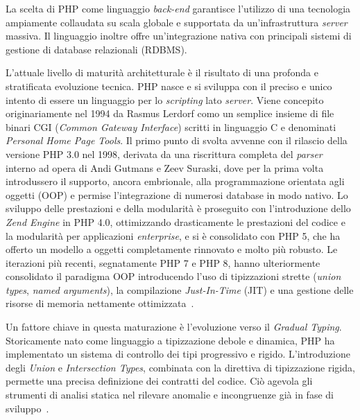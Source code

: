 La scelta di PHP come linguaggio \textit{back-end} garantisce l’utilizzo di una tecnologia ampiamente collaudata su scala globale e supportata da un’infrastruttura \textit{server} massiva. Il linguaggio inoltre offre un’integrazione nativa con principali sistemi di gestione di database relazionali (RDBMS).

L’attuale livello di maturità architetturale è il risultato di una profonda e stratificata evoluzione tecnica. PHP nasce e si sviluppa con il preciso e unico intento di essere un linguaggio per lo \textit{scripting} lato \textit{server}. 
Viene concepito originariamente nel 1994 da Rasmus Lerdorf como un semplice insieme di file binari CGI (\textit{Common Gateway Interface}) scritti in linguaggio C e denominati \textit{Personal Home Page Tools}. 
Il primo punto di svolta avvenne con il rilascio della versione PHP 3.0 nel 1998, derivata da una riscrittura completa del \textit{parser} interno ad opera di Andi Gutmans e Zeev Suraski, dove per la prima volta introdussero il supporto, ancora embrionale, alla programmazione orientata agli oggetti (OOP) e permise l’integrazione di numerosi database in modo nativo. 
Lo sviluppo delle prestazioni e della modularità è proseguito con l'introduzione dello \textit{Zend Engine} in PHP 4.0, ottimizzando drasticamente le prestazioni del codice e la modularità per applicazioni \textit{enterprise}, e si è consolidato con PHP 5, che ha offerto un modello a oggetti completamente rinnovato e molto più robusto. Le iterazioni più recenti, segnatamente PHP 7 e PHP 8, hanno ulteriormente consolidato il paradigma OOP introducendo l'uso di tipizzazioni strette (\textit{union types}, \textit{named arguments}), la compilazione \textit{Just-In-Time} (JIT) e una gestione delle risorse di memoria nettamente ottimizzata~\autocite{PHPHistoryPHP}.

Un fattore chiave in questa maturazione è l'evoluzione verso il \textit{Gradual Typing}. Storicamente nato come linguaggio a tipizzazione debole e dinamica, PHP ha implementato un sistema di controllo dei tipi progressivo e rigido. L’introduzione degli \textit{Union} e \textit{Intersection Types}, combinata con la direttiva di tipizzazione rigida, permette una precisa definizione dei contratti del codice. Ciò agevola gli strumenti di analisi statica nel rilevare anomalie e incongruenze già in fase di sviluppo~\autocite{PHPPrefaceManual}.

